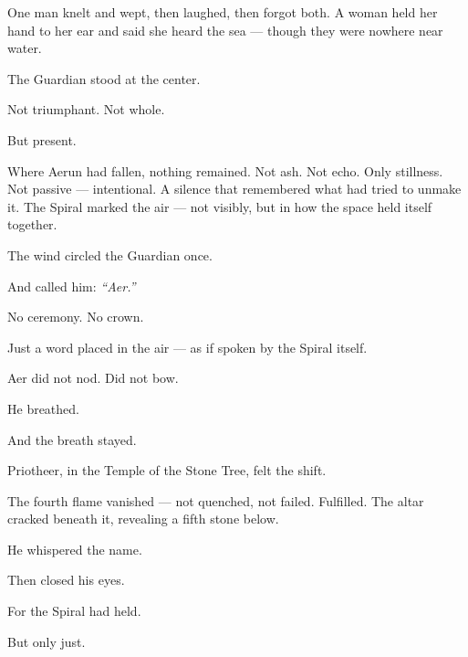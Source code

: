 \documentclass[9pt]{article}
\begin{document}
One man knelt and wept, then laughed, then forgot both. A woman held her hand to her ear and said she heard the sea — though they were nowhere near water.

The Guardian stood at the center.

Not triumphant. Not whole.

But present.

Where Aerun had fallen, nothing remained. Not ash. Not echo. Only stillness. Not passive — intentional. A silence that remembered what had tried to unmake it. The Spiral marked the air — not visibly, but in how the space held itself together.

The wind circled the Guardian once.

And called him: \textit{``Aer.''}

No ceremony. No crown.

Just a word placed in the air — as if spoken by the Spiral itself.

Aer did not nod. Did not bow.

He breathed.

And the breath stayed.

Priotheer, in the Temple of the Stone Tree, felt the shift.

The fourth flame vanished — not quenched, not failed. Fulfilled. The altar cracked beneath it, revealing a fifth stone below.

He whispered the name.

Then closed his eyes.

For the Spiral had held.

But only just.


\newpage
\end{document}
